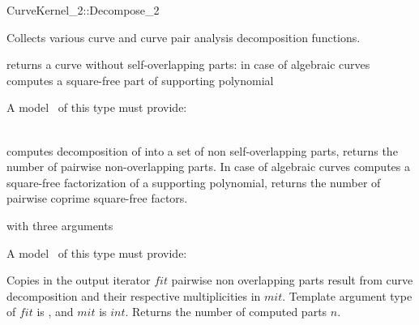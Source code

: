 \begin{ccRefFunctionObjectConcept}{CurveKernel_2::Decompose_2}

Collects various curve and curve pair analysis decomposition functions.

\ccDefinition
returns a curve without self-overlapping parts: in case of algebraic curves 
computes a square-free part of supporting polynomial
 
\ccRefines 
{}  

\ccTypes
{}
\ccGlue
{}

\ccOperations
{}

A model \ccVar\ of this type must provide:


\ccSeeAlso
{}\\

\ccDefinition
computes decomposition of  into a set of non self-overlapping parts, returns the number of pairwise non-overlapping parts. In case of algebraic curves
computes a square-free factorization of a supporting polynomial, returns the number of pairwise coprime square-free factors.

\ccRefines 
{} with three arguments

\ccTypes
{}
\ccGlue
{}


\ccOperations
{}

A model \ccVar\ of this type must provide:

{Copies in the output iterator $fit$ pairwise non overlapping parts result from curve decomposition and their respective multiplicities in $mit$. Template argument type of $fit$ is
, and $mit$ is $int$. Returns the number of computed parts $n$.}


\end{ccRefFunctionObjectConcept}
